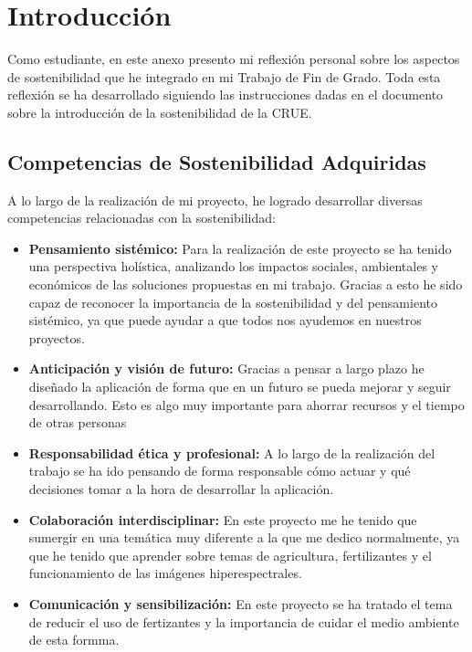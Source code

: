 
\section{Introducción}
Como estudiante, en este anexo presento mi reflexión personal sobre los aspectos de sostenibilidad que he integrado en mi Trabajo de Fin de Grado.
Toda esta reflexión se ha desarrollado siguiendo las instrucciones dadas en el documento sobre la introducción de la sostenibilidad de la CRUE.~\cite{dirsos}

\subsection{Competencias de Sostenibilidad Adquiridas}
A lo largo de la realización de mi proyecto, he logrado desarrollar diversas competencias relacionadas con la sostenibilidad:

\begin{itemize}
    \item \textbf{Pensamiento sistémico:} Para la realización de este proyecto se ha tenido una perspectiva holística, analizando los impactos sociales, ambientales y económicos de las soluciones propuestas en mi trabajo. Gracias a esto he sido capaz de reconocer la importancia de la sostenibilidad y del pensamiento sistémico, ya que puede ayudar a que todos nos ayudemos en nuestros proyectos.
    \item \textbf{Anticipación y visión de futuro:} Gracias a pensar a largo plazo he diseñado la aplicación de forma que en un futuro se pueda mejorar y seguir desarrollando. Esto es algo muy importante para ahorrar recursos y el tiempo de otras personas
    \item \textbf{Responsabilidad ética y profesional:} A lo largo de la realización del trabajo se ha ido pensando de forma responsable cómo actuar y qué decisiones tomar a la hora de desarrollar la aplicación.
    \item \textbf{Colaboración interdisciplinar:} En este proyecto me he tenido que sumergir en una temática muy diferente a la que me dedico normalmente, ya que he tenido que aprender sobre temas de agricultura, fertilizantes y el funcionamiento de las imágenes hiperespectrales.
    \item \textbf{Comunicación y sensibilización:} En este proyecto se ha tratado el tema de reducir el uso de fertizantes y la importancia de cuidar el medio ambiente de esta formma.
\end{itemize}



